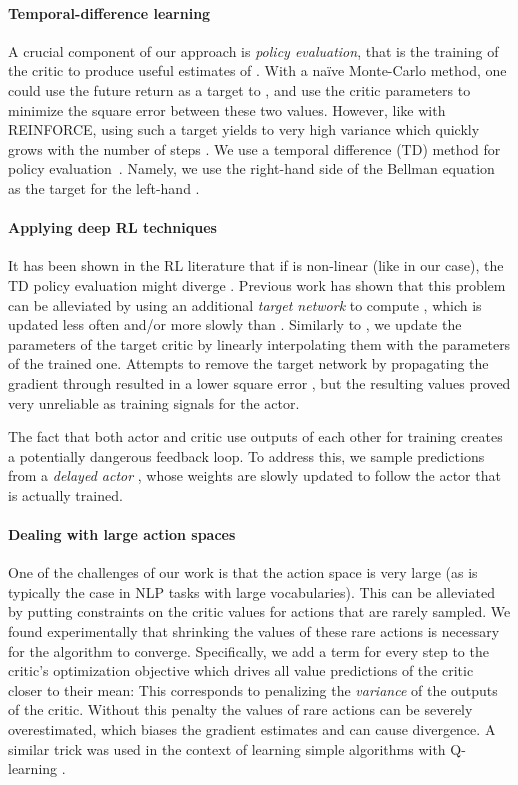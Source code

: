 \documentclass{article} \usepackage{iclr2017_conference,times}
\begin{document}
\paragraph{Temporal-difference learning}
A crucial component of our approach is \emph{policy evaluation}, that is the training of the critic
to produce useful estimates of . With a na{\"i}ve Monte-Carlo method, one could use the future
return  as a target to , and use the
critic parameters  to minimize the square error between these two values.
However, like with REINFORCE, using such a target yields to
very high variance which quickly grows with the number
of steps .
We use a temporal difference (TD) method for policy
evaluation~\citep{sutton1988learning}. Namely, we use the right-hand side 
 of the Bellman equation as the
target for the left-hand .




\paragraph{Applying deep RL techniques}

It has been shown in the RL literature that if  is non-linear (like 
in our case), the TD policy evaluation might diverge \citep{tsitsiklis1997analysis}.
Previous work has shown that this problem can be alleviated by using an additional
\emph{target network}
 to compute , which is updated less often and/or more slowly than . 
Similarly to \citep{lillicrap2015continuous}, we update the parameters 
of the target critic by linearly interpolating them with the parameters of the trained
one.
Attempts to remove the target network by propagating the gradient through  
resulted in a lower square error 
, but the resulting  
values proved very unreliable as training signals for the actor.

The fact that both actor and critic use
outputs of each other for training creates a potentially
dangerous feedback loop. To address this, we
sample predictions from a \textit{delayed actor} \citep{lillicrap2015continuous},
whose weights are slowly updated to follow the actor that
is actually trained.

\paragraph{Dealing with large action spaces}

One of the challenges of our work is that the action space is very large (as is typically the case in
NLP tasks with large vocabularies). This can be alleviated by putting constraints on
the critic values for actions that are rarely sampled. We found experimentally
that shrinking the values of these rare actions is
 necessary for the algorithm to converge. Specifically, we add a term  for every step  to the
critic's optimization objective which drives all value predictions of the critic
closer to their mean: 
 This corresponds to
penalizing the \emph{variance} of the outputs of the critic. 
Without this penalty the values of rare actions can be severely overestimated,
which biases the gradient estimates and can cause divergence. 
A similar trick was used in the context of learning 
simple algorithms with Q-learning \citep{zaremba2015learning}.
\end{document}
